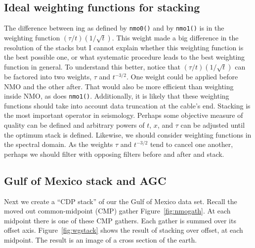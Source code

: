 \subsection{Ideal weighting functions for stacking}
The difference between ing as defined by
\texttt{nmo0()}  and by
\texttt{nmo1()} 
is in the weighting function $(\tau/t)(1/\sqrt{t})$.
This weight made a big difference in the resolution of the stacks
but I cannot explain
whether this weighting function is the best possible one,
or what systematic procedure
leads to the best weighting function in general.
To understand this better, 
notice that $(\tau/t)(1/\sqrt{t})$
can be factored into two weights, $\tau$ and $t^{-3/2}$.
One weight could be applied before NMO and the other after.
That would also be more efficient than weighting inside NMO,
as does {\tt nmo1()}.
Additionally, it is likely that
these weighting functions should take into account
data truncation at the cable's end.
Stacking is the most important operator in seismology.
Perhaps some objective measure of quality can be defined
and arbitrary powers of $t$, $x$, and $\tau$
can be adjusted until the optimum stack is defined.
Likewise, we should consider weighting functions in the spectral domain.
As the weights $\tau$ and $t^{-3/2}$
tend to cancel one another,
perhaps we should filter with opposing filters
before and after  and stack.

\subsection{Gulf of Mexico stack and AGC}
\par
Next we create a ``CDP stack'' of our the Gulf of Mexico data set.
Recall the moved out common-midpoint (CMP) gather
Figure~\ref{fig:nmogath}.
At each midpoint there is one of these CMP gathers.
Each gather is summed over its offset axis.
Figure~\ref{fig:wgstack} shows the result of stacking over offset,
at each midpoint.
The result is an image of a cross section of the earth.

